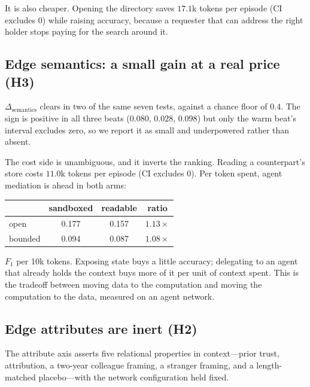 It is also cheaper. Opening the directory saves $17.1$k tokens per episode
(CI excludes 0) while raising accuracy, because a requester that can address the
right holder stops paying for the search around it.

\subsection{Edge semantics: a small gain at a real price (H3)}

$\Delta_\text{semantics}$ clears in two of the same seven tests, against a
chance floor of $0.4$. The sign is positive in all three beats
($0.080$, $0.028$, $0.098$) but only the warm beat's interval excludes zero, so
we report it as small and underpowered rather than absent.

The cost side is unambiguous, and it inverts the ranking. Reading a
counterpart's store costs $11.0$k tokens per episode (CI excludes 0). Per token
spent, agent mediation is ahead in both arms:

\begin{center}\small
\begin{tabular}{@{}lccc@{}}
\toprule
& sandboxed & readable & ratio \\
\midrule
open    & 0.177 & 0.157 & $1.13\times$ \\
bounded & 0.094 & 0.087 & $1.08\times$ \\
\bottomrule
\end{tabular}
\end{center}
\noindent
$F_1$ per 10k tokens. Exposing state buys a little accuracy; delegating to an
agent that already holds the context buys more of it per unit of context spent.
This is the tradeoff between moving data to the computation and moving the
computation to the data, measured on an agent network.

\subsection{Edge attributes are inert (H2)}

The attribute axis asserts five relational properties in context---prior trust,
attribution, a two-year colleague framing, a stranger framing, and a
length-matched placebo---with the network configuration held fixed.

